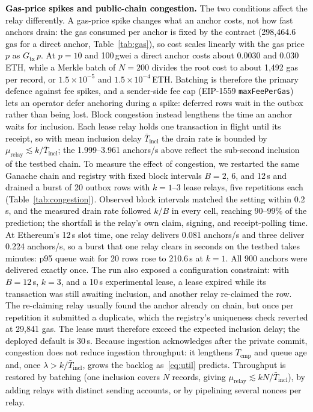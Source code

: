 \documentclass[final,5p,times,twocolumn]{elsarticle}
\begin{document}
\textcolor{black}{\textbf{Gas-price spikes and public-chain congestion.} The two conditions affect the relay differently. A gas-price spike changes what an anchor costs, not how fast anchors drain: the gas consumed per anchor is fixed by the contract (298{,}464.6 gas for a direct anchor, Table~\ref{tab:gas}), so cost scales linearly with the gas price $p$ as $G_{\mathrm{tx}}\,p$. At $p=10$ and 100\,gwei a direct anchor costs about 0.0030 and 0.030\,ETH, while a Merkle batch of $N=200$ divides the root cost to about 1{,}492 gas per record, or $1.5\times10^{-5}$ and $1.5\times10^{-4}$\,ETH. Batching is therefore the primary defence against fee spikes, and a sender-side fee cap (EIP-1559 \texttt{maxFeePerGas}) lets an operator defer anchoring during a spike: deferred rows wait in the outbox rather than being lost. Block congestion instead lengthens the time an anchor waits for inclusion. Each lease relay holds one transaction in flight until its receipt, so with mean inclusion delay $\bar{T}_{\mathrm{incl}}$ the drain rate is bounded by $\mu_{\mathrm{relay}}\lesssim k/\bar{T}_{\mathrm{incl}}$; the 1.999--3.961 anchors/s above reflect the sub-second inclusion of the testbed chain. To measure the effect of congestion, we restarted the same Ganache chain and registry with fixed block intervals $B=2$, 6, and 12\,s and drained a burst of 20 outbox rows with $k=1$--3 lease relays, five repetitions each (Table~\ref{tab:congestion}). Observed block intervals matched the setting within 0.2\,s, and the measured drain rate followed $k/B$ in every cell, reaching 90--99\% of the prediction; the shortfall is the relay's own claim, signing, and receipt-polling time. At Ethereum's 12\,s slot time, one relay delivers 0.081 anchors/s and three deliver 0.224 anchors/s, so a burst that one relay clears in seconds on the testbed takes minutes: p95 queue wait for 20 rows rose to 210.6\,s at $k=1$. All 900 anchors were delivered exactly once. The run also exposed a configuration constraint: with $B=12$\,s, $k=3$, and a 10\,s experimental lease, a lease expired while its transaction was still awaiting inclusion, and another relay re-claimed the row. The re-claiming relay usually found the anchor already on chain, but once per repetition it submitted a duplicate, which the registry's uniqueness check reverted at 29{,}841 gas. The lease must therefore exceed the expected inclusion delay; the deployed default is 30\,s. Because ingestion acknowledges after the private commit, congestion does not reduce ingestion throughput: it lengthens $T_{\mathrm{cmp}}$ and queue age and, once $\lambda>k/\bar{T}_{\mathrm{incl}}$, grows the backlog as~\eqref{eq:util} predicts. Throughput is restored by batching (one inclusion covers $N$ records, giving $\mu_{\mathrm{relay}}\lesssim kN/\bar{T}_{\mathrm{incl}}$), by adding relays with distinct sending accounts, or by pipelining several nonces per relay.}
\end{document}
